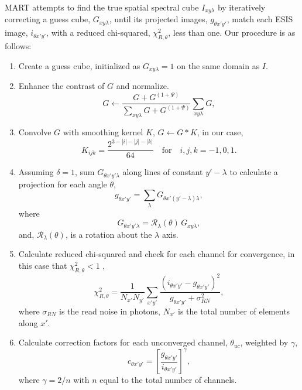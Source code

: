 \documentclass[linenumbers,trackchanges]{aastex63}
\begin{document}
MART attempts to find the true spatial spectral cube $I_{xy\lambda}$ by iteratively correcting a guess cube, $G_{xy\lambda}$, until its projected images, $g_{\theta x'y'}$, match each ESIS image, $i_{\theta x'y'}$, with a reduced chi-squared, $\chi_{R,\theta}^2$,  less than one.
Our procedure is as follows:
\begin{enumerate}
	\item \label{step:guess} Create a guess cube,
	initialized as 
	$G_{xy\lambda} = 1$ on the same domain as $I$. 
	\item \label{step:contrast} Enhance the contrast of $G$ and normalize. 
	\begin{equation}
	G \leftarrow \frac{G+G^{(1+\Psi)}}{\sum_{xy\lambda}G+G^{(1+\Psi)}}\sum_{xy\lambda}G, 
	\end{equation}
	
	\item \label{step:smooth} Convolve $G$ with smoothing kernel $K$, $G \leftarrow G * K$,
	in our case,
	\begin{equation}
	\label{eq:kernel}
	K_{ijk} = \frac{2^{3-|i|-|j|-|k|}}{64} \quad \text{for}\quad i,j,k = -1,0,1.
	\end{equation}
	\item \label{step:project} Assuming $\delta=1$, sum $G_{\theta x'y'\lambda}$ along lines of constant $y'-\lambda$ to calculate a projection for each angle $\theta$,
	\begin{equation}
	g_{\theta x'y'} = \sum_\lambda G_{\theta x'(y'-\lambda)\lambda}, 
	\end{equation}
	where
	\begin{equation}
	G_{\theta x'y'\lambda} = \mathcal{R}_\lambda(\theta)\,G_{xy\lambda},
	\end{equation} 
	and, $\mathcal{R}_\lambda (\theta)$, is a rotation about the $\lambda$ axis. 	
	
	\item \label{step:chisquared} Calculate reduced chi-squared and check for each channel for convergence, in this case that $\chi_{R,\theta}^2 < 1$ , 
	\begin{equation}
	\chi_{R,\theta}^2 = \frac{1}{N_{x'} N_{y'}}\sum_{x'y'} \frac{(i_{\theta x'y'}-g_{\theta x'y'})^2}{g_{\theta x'y'}+\sigma^2_{RN}},
	\end{equation}
	where $\sigma_{RN}$ is the read noise in photons, $N_{x'}$ is the total number of elements along $x'$.
	
	\item Calculate correction factors for each unconverged channel, $\theta_{uc}$, weighted by $\gamma$, 
	\begin{equation} \label{eq:correctionfactor}
	c_{\theta x'y'} = \left[\frac{g_{\theta x'y'}}{i_{\theta x'y'}}\right]^\gamma,
	\end{equation}
	where $\gamma = 2/n$ with $n$ equal to the total number of channels.
	

\end{enumerate}
\end{document}
